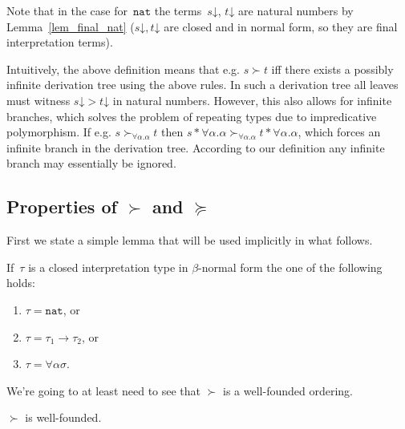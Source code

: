 \documentclass[runningheads,a4paper]{llncs}
\newcommand{\arrtype}{\rightarrow}
\newcommand{\tapp}[2]{#1 * #2}
\newcommand{\nat}{\mathtt{nat}}
\newcommand{\da}{\mathord{\downarrow}}
\begin{document}
Note that in the case for~$\nat$ the terms~$s\da$, $t\da$ are natural
numbers by Lemma~\ref{lem_final_nat} ($s\da,t\da$ are closed and in
normal form, so they are final interpretation terms).

Intuitively, the above definition means that e.g. $s \succ t$ iff
there exists a possibly infinite derivation tree using the above
rules. In such a derivation tree all leaves must witness $s\da > t\da$
in natural numbers. However, this also allows for infinite branches,
which solves the problem of repeating types due to impredicative
polymorphism. If e.g.  $s \succ_{\forall \alpha . \alpha} t$ then
$\tapp{s}{\forall\alpha.\alpha} \succ_{\forall \alpha . \alpha}
\tapp{t}{\forall\alpha.\alpha}$, which forces an infinite branch in
the derivation tree. According to our definition any infinite branch
may essentially be ignored.

\subsection{Properties of $\succ$ and $\succeq$}

First we state a simple lemma that will be used implicitly in what
follows.

\begin{lemma}
  If~$\tau$ is a closed interpretation type in $\beta$-normal form the
  one of the following holds:
  \begin{enumerate}
  \item $\tau = \nat$, or
  \item $\tau = \tau_1\arrtype\tau_2$, or
  \item $\tau = \forall\alpha\sigma$.
  \end{enumerate}
\end{lemma}

We're going to at least need to see that $\succ$ is a well-founded
ordering.

\begin{lemma}
  $\succ$ is well-founded.
\end{lemma}
\end{document}
